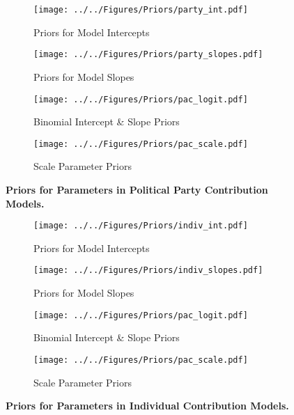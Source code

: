 \documentclass[12pt]{article}
\begin{document}
\begin{appendices}
\begin{figure*}[ht]
    \centering
    \begin{subfigure}[b]{0.45\textwidth}
        \centering
        \texttt{[image: ../../Figures/Priors/party\_int.pdf]}
        \caption{Priors for Model Intercepts}
    \end{subfigure}
    \begin{subfigure}[b]{0.45\textwidth}
        \centering
        \texttt{[image: ../../Figures/Priors/party\_slopes.pdf]}
        \caption{Priors for Model Slopes}
    \end{subfigure}
    \begin{subfigure}[b]{0.45\textwidth}
    	\centering
        \texttt{[image: ../../Figures/Priors/pac\_logit.pdf]}
        \caption{Binomial Intercept \& Slope Priors}
    \end{subfigure}
    \begin{subfigure}[b]{0.45\textwidth}
    	\centering
        \texttt{[image: ../../Figures/Priors/pac\_scale.pdf]}
        \caption{Scale Parameter Priors}
    \end{subfigure}
    \caption{\textbf{Priors for Parameters in Political Party Contribution Models.}}
    \label{fig: priors}
\end{figure*}

\begin{figure*}[t]
    \centering
    \begin{subfigure}[b]{0.45\textwidth}
        \centering
        \texttt{[image: ../../Figures/Priors/indiv\_int.pdf]}
        \caption{Priors for Model Intercepts}
    \end{subfigure}
    \begin{subfigure}[b]{0.45\textwidth}
        \centering
        \texttt{[image: ../../Figures/Priors/indiv\_slopes.pdf]}
        \caption{Priors for Model Slopes}
    \end{subfigure}
    \begin{subfigure}[b]{0.45\textwidth}
    	\centering
        \texttt{[image: ../../Figures/Priors/pac\_logit.pdf]}
        \caption{Binomial Intercept \& Slope Priors}
    \end{subfigure}
    \begin{subfigure}[b]{0.45\textwidth}
    	\centering
        \texttt{[image: ../../Figures/Priors/pac\_scale.pdf]}
        \caption{Scale Parameter Priors}
    \end{subfigure}
    \caption{\textbf{Priors for Parameters in Individual Contribution Models.}}
    \label{fig: priors}
\end{figure*}


\end{appendices}
\end{document}
